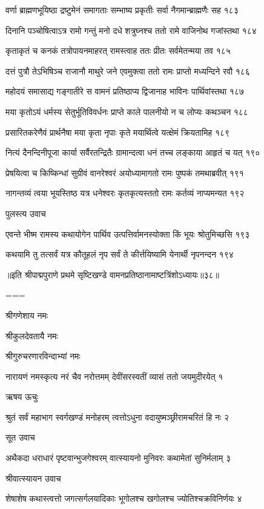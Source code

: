 वर्णा ब्राह्मणभूयिष्ठा द्रष्टुमेनं समागताः
सम्भाष्य प्रकृतीः सर्वा नैगमान्ब्राह्मणैः सह १८३

दिनानि पञ्चोषित्वाऽत्र रामो गन्तुं मनो दधे
शत्रुघ्नश्च ततो रामे वाजिनोथ गजांस्तथा १८४

कृताकृतं च कनकं तत्रोपायनमाहरत्
रामस्त्वाह ततः प्रीतः सर्वमेतन्मया तव १८५

दत्तं पुत्रौ तेऽभिषिञ्च राजानौ माथुरे जने
एवमुक्त्वा ततो रामः प्राप्तो मध्यन्दिने रवौ १८६

महोदयं समासाद्य गङ्गातीरे स वामनं
प्रतिष्ठाप्य द्विजानाह भाविनः पार्थिवांस्तथा १८७

मया कृतोऽयं धर्मस्य सेतुर्भूतिविवर्धनः
प्राप्ते काले पालनीयो न च लोप्यः कथञ्चन १८८

प्रसारितकरेणैवं प्रार्थनैषा मया कृता
नृपाः कृते मयार्थित्वे यत्क्षेमं क्रियतामिह १८९

नित्यं दैनन्दिनीपूजा कार्या सर्वैरतन्द्रितैः
ग्रामान्दत्वा धनं तच्च लङ्काया आहृतं च यत् १९०

प्रेषयित्वा च किष्किन्धां सुग्रीवं वानरेश्वरं
अयोध्यामागतो रामः पुष्पकं तमथाब्रवीत् १९१

नागन्तव्यं त्वया भूयस्तिष्ठ यत्र धनेश्वरः
कृतकृत्यस्ततो रामः कर्तव्यं नाप्यमन्यत १९२

पुलस्त्य उवाच

एवन्ते भीष्म रामस्य कथायोगेन पार्थिव
उत्पत्तिर्वामनस्योक्ता किं भूयः श्रोतुमिच्छसि १९३

कथयामि तु तत्सर्वं यत्र कौतूहलं नृप
सर्वं ते कीर्त्तयिष्यामि येनार्थी नृपनन्दन १९४

॥इति श्रीपाद्मपुराणे प्रथमे सृष्टिखण्डे वामनप्रतिष्ठानामाष्टत्रिंशोऽध्यायः॥३८॥


===



श्रीगणेशाय नमः

श्रीकुलदेवतायै नमः

श्रीगुरुचरणारविन्दाभ्यां नमः

नारायणं नमस्कृत्य नरं चैव नरोत्तमम्
देवींसरस्वतीं व्यासं ततो जयमुदीरयेत् १

ऋषय ऊचुः

श्रुतं सर्वं महाभाग स्वर्गखण्डं मनोहरम्
त्वत्तोऽधुना वदायुष्मञ्छ्रीरामचरितं हि नः २

सूत उवाच

अथैकदा धराधारं पृष्टवान्भुजगेश्वरम्
वात्स्यायनो मुनिवरः कथामेतां सुनिर्मलाम् ३

श्रीवात्स्यायन उवाच

शेषाशेष कथास्त्वत्तो जगत्सर्गलयादिकाः
भूगोलश्च खगोलश्च ज्योतिश्चक्रविनिर्णयः ४

